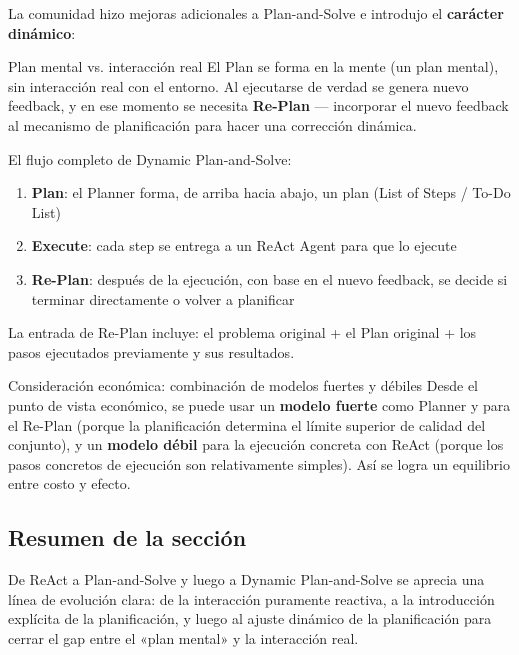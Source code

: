 La comunidad hizo mejoras adicionales a Plan-and-Solve e introdujo el \textbf{carácter dinámico}:

\begin{importantbox}{Plan mental vs. interacción real}
El Plan se forma en la mente (un plan mental), sin interacción real con el entorno. Al ejecutarse de verdad se genera nuevo feedback, y en ese momento se necesita \textbf{Re-Plan} — incorporar el nuevo feedback al mecanismo de planificación para hacer una corrección dinámica.
\end{importantbox}

El flujo completo de Dynamic Plan-and-Solve:
\begin{enumerate}
    \item \textbf{Plan}: el Planner forma, de arriba hacia abajo, un plan (List of Steps / To-Do List)
    \item \textbf{Execute}: cada step se entrega a un ReAct Agent para que lo ejecute
    \item \textbf{Re-Plan}: después de la ejecución, con base en el nuevo feedback, se decide si terminar directamente o volver a planificar
\end{enumerate}

La entrada de Re-Plan incluye: el problema original + el Plan original + los pasos ejecutados previamente y sus resultados.

\begin{knowledgebox}{Consideración económica: combinación de modelos fuertes y débiles}
Desde el punto de vista económico, se puede usar un \textbf{modelo fuerte} como Planner y para el Re-Plan (porque la planificación determina el límite superior de calidad del conjunto), y un \textbf{modelo débil} para la ejecución concreta con ReAct (porque los pasos concretos de ejecución son relativamente simples). Así se logra un equilibrio entre costo y efecto.
\end{knowledgebox}

\subsection{Resumen de la sección}

De ReAct a Plan-and-Solve y luego a Dynamic Plan-and-Solve se aprecia una línea de evolución clara: de la interacción puramente reactiva, a la introducción explícita de la planificación, y luego al ajuste dinámico de la planificación para cerrar el gap entre el «plan mental» y la interacción real.


